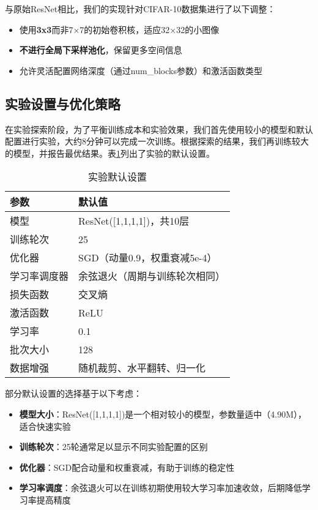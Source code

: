 \documentclass[12pt,a4paper]{article}
\begin{document}
与原始ResNet相比，我们的实现针对CIFAR-10数据集进行了以下调整：
\begin{itemize}
    \item 使用\textbf{3x3}而非7×7的初始卷积核，适应32×32的小图像
    \item \textbf{不进行全局下采样池化}，保留更多空间信息
    \item 允许灵活配置网络深度（通过num\_blocks参数）和激活函数类型
\end{itemize}


\subsection{实验设置与优化策略}

在实验探索阶段，为了平衡训练成本和实验效果，我们首先使用较小的模型和默认配置进行实验，大约8分钟可以完成一次训练。根据探索的结果，我们再训练较大的模型，并报告最优结果。表\ref{tab:default_settings}列出了实验的默认设置。

\begin{table}[htbp]
\centering
\caption{实验默认设置}
\label{tab:default_settings}
\begin{tabular}{ll}
\toprule
\textbf{参数} & \textbf{默认值} \\
\midrule
模型 & ResNet([1,1,1,1])，共10层 \\
训练轮次 & 25 \\
优化器 & SGD（动量0.9，权重衰减5e-4） \\
学习率调度器 & 余弦退火（周期与训练轮次相同） \\
损失函数 & 交叉熵 \\
激活函数 & ReLU \\
学习率 & 0.1 \\
批次大小 & 128 \\
数据增强 & 随机裁剪、水平翻转、归一化 \\
\bottomrule
\end{tabular}
\end{table}

部分默认设置的选择基于以下考虑：
\begin{itemize}
    \item \textbf{模型大小}：ResNet([1,1,1,1])是一个相对较小的模型，参数量适中（4.90M），适合快速实验
    \item \textbf{训练轮次}：25轮通常足以显示不同实验配置的区别
    \item \textbf{优化器}：SGD配合动量和权重衰减，有助于训练的稳定性
    \item \textbf{学习率调度}：余弦退火可以在训练初期使用较大学习率加速收敛，后期降低学习率提高精度
\end{itemize}
\end{document}
